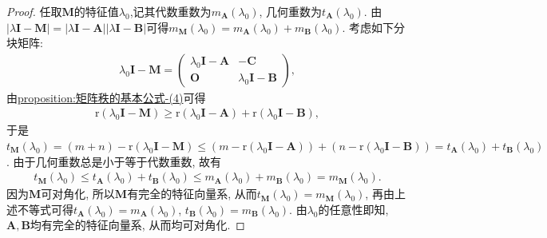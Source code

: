 \documentclass[../../main.tex]{subfiles}%
\begin{document}
\begin{proof} 
任取\(\boldsymbol{M}\)的特征值\(\lambda_0\),记其代数重数为\(m_{\boldsymbol{A}}(\lambda_0)\), 几何重数为\(t_{\boldsymbol{A}}(\lambda_0)\).  由\(|\lambda\boldsymbol{I}-\boldsymbol{M}| = |\lambda\boldsymbol{I} - \boldsymbol{A}||\lambda\boldsymbol{I} - \boldsymbol{B}|\)可得\(m_{\boldsymbol{M}}(\lambda_0) = m_{\boldsymbol{A}}(\lambda_0)+m_{\boldsymbol{B}}(\lambda_0)\). 考虑如下分块矩阵:
\begin{align*}
\lambda_0\boldsymbol{I} - \boldsymbol{M} = \begin{pmatrix}
\lambda_0\boldsymbol{I} - \boldsymbol{A}&-\boldsymbol{C}\\
\boldsymbol{O}&\lambda_0\boldsymbol{I} - \boldsymbol{B}
\end{pmatrix},
\end{align*}
由\hyperref[proposition:矩阵秩的基本公式-4]{proposition:矩阵秩的基本公式-(4)}可得
\begin{align*}
\mathrm{r}(\lambda_0\boldsymbol{I} - \boldsymbol{M})\geqslant  \mathrm{r}(\lambda_0\boldsymbol{I} - \boldsymbol{A})+\mathrm{r}(\lambda_0\boldsymbol{I} - \boldsymbol{B}),
\end{align*}
于是\(t_{\boldsymbol{M}}(\lambda_0) = (m + n) - \mathrm{r}(\lambda_0\boldsymbol{I} - \boldsymbol{M})\leqslant  (m - \mathrm{r}(\lambda_0\boldsymbol{I} - \boldsymbol{A}))+(n - \mathrm{r}(\lambda_0\boldsymbol{I} - \boldsymbol{B})) = t_{\boldsymbol{A}}(\lambda_0)+t_{\boldsymbol{B}}(\lambda_0)\). 由于几何重数总是小于等于代数重数, 故有
\begin{align*}
t_{\boldsymbol{M}}(\lambda_0)\leqslant  t_{\boldsymbol{A}}(\lambda_0)+t_{\boldsymbol{B}}(\lambda_0)\leqslant  m_{\boldsymbol{A}}(\lambda_0)+m_{\boldsymbol{B}}(\lambda_0) = m_{\boldsymbol{M}}(\lambda_0).
\end{align*}
因为\(\boldsymbol{M}\)可对角化, 所以\(\boldsymbol{M}\)有完全的特征向量系, 从而\(t_{\boldsymbol{M}}(\lambda_0) = m_{\boldsymbol{M}}(\lambda_0)\), 再由上述不等式可得\(t_{\boldsymbol{A}}(\lambda_0) = m_{\boldsymbol{A}}(\lambda_0)\), \(t_{\boldsymbol{B}}(\lambda_0) = m_{\boldsymbol{B}}(\lambda_0)\). 由\(\lambda_0\)的任意性即知, \(\boldsymbol{A},\boldsymbol{B}\)均有完全的特征向量系, 从而均可对角化. 
\end{proof}
\end{document}
